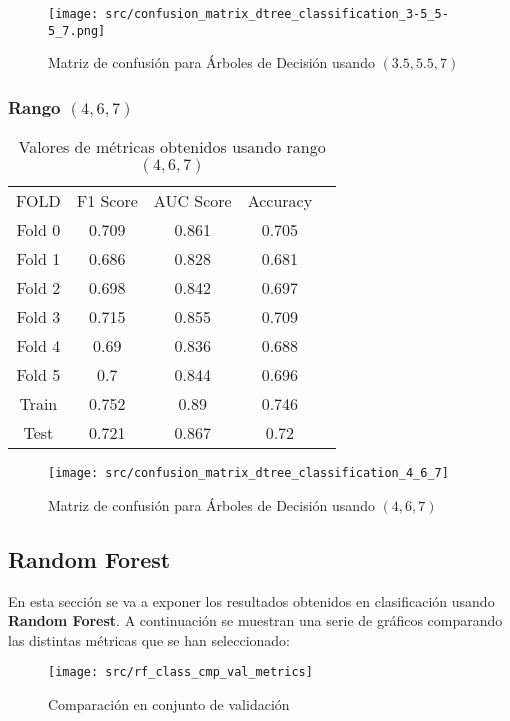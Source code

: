 \begin{figure}[H]
	\centering
	\texttt{[image: src/confusion\_matrix\_dtree\_classification\_3-5\_5-5\_7.png]}
	\caption{Matriz de confusión para Árboles de Decisión usando $(3.5,5.5,7)$}
	\label{fig:confusion_matrix_dtree1}
\end{figure}
\subsubsection*{Rango $(4,6,7)$}
\begin{table}[H]
	\centering
	\begin{tabular}{|c|c|c|c|c}
		\cline{1-4}
		FOLD   & F1 Score & AUC Score & Accuracy \\ \cline{1-4}
		Fold 0 & 0.709    & 0.861     & 0.705    \\ \cline{1-4}
		Fold 1 & 0.686    & 0.828     & 0.681    \\ \cline{1-4}
		Fold 2 & 0.698    & 0.842     & 0.697    \\ \cline{1-4}
		Fold 3 & 0.715    & 0.855     & 0.709    \\ \cline{1-4}
		Fold 4 & 0.69     & 0.836     & 0.688    \\ \cline{1-4}
		Fold 5 & 0.7      & 0.844     & 0.696    \\ \cline{1-4}
		Train  & 0.752    & 0.89      & 0.746    \\ \cline{1-4}
		Test   & 0.721    & 0.867     & 0.72     \\ \cline{1-4}
	\end{tabular}
	\caption{Valores de métricas obtenidos usando rango $(4,6,7)$}
\end{table}

\begin{figure}[H]
	\centering
	\texttt{[image: src/confusion\_matrix\_dtree\_classification\_4\_6\_7]}
	\caption{Matriz de confusión para Árboles de Decisión usando $(4,6,7)$}
	\label{fig:confusion_matrix_dtree2}
\end{figure}
\pagebreak
\subsection{Random Forest}
En esta sección se va a exponer los resultados obtenidos en clasificación usando \textbf{Random Forest}.
A continuación se muestran una serie de gráficos comparando las distintas métricas que se han seleccionado:
\begin{figure}[H]
	\centering
	\texttt{[image: src/rf\_class\_cmp\_val\_metrics]}
	\caption{Comparación en conjunto de validación}
	\label{fig:rf_class_cmp_val}
\end{figure}


